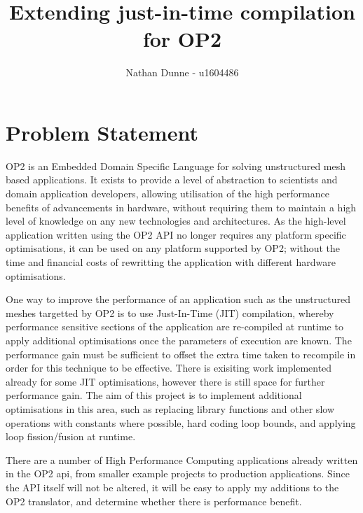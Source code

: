 \documentclass[11pt]{article}
\title{Extending just-in-time compilation for OP2}
\author{Nathan Dunne - u1604486}
\begin{document}
\maketitle
\section*{Problem Statement}
OP2 is an Embedded Domain Specific Language for solving unstructured mesh based applications. It exists to provide a level of abstraction to scientists and domain application developers, allowing utilisation of the high performance benefits of advancements in hardware, without requiring them to maintain a high level of knowledge on any new technologies and architectures. As the high-level application written using the OP2 API no longer requires any platform specific optimisations, it can be used on any platform supported by OP2; without the time and financial costs of rewritting the application with different hardware optimisations.
\newline
\par
One way to improve the performance of an application such as the unstructured meshes targetted by OP2 is to use Just-In-Time (JIT) compilation, whereby performance sensitive sections of the application are re-compiled at runtime to apply additional optimisations once the parameters of execution are known. The performance gain must be sufficient to offset the extra time taken to recompile in order for this technique to be effective. There is exisiting work implemented already for some JIT optimisations, however there is still space for further performance gain. The aim of this project is to implement additional optimisations in this area, such as replacing library functions and other slow operations with constants where possible, hard coding loop bounds, and applying loop fission/fusion at runtime.
\newline
\par
There are a number of High Performance Computing applications already written in the OP2 api, from smaller example projects to production applications. Since the API itself will not be altered, it will be easy to apply my additions to the OP2 translator, and determine whether there is performance benefit.
\end{document}
